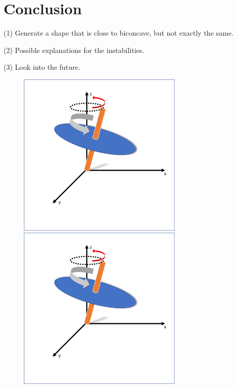 \documentclass[10pt]{beamer}
\begin{document}
\section{Conclusion}

\begin{frame}

(1) Generate a shape that is close to biconcave, but not exactly the same.

(2) Possible explanations for the instabilities.

(3) Look into the future.

\end{frame}


\begin{figure}[h]
	\begin{minipage}{0.6\textwidth}
		\centering
		\includegraphics[width=0.7\textwidth]{sphere1.png}
	\end{minipage}
	\begin{minipage}{0.6\textwidth}
		\centering
		\includegraphics[width=0.7\textwidth]{sphere1.png}
	\end{minipage}
\end{figure}
\end{document}
